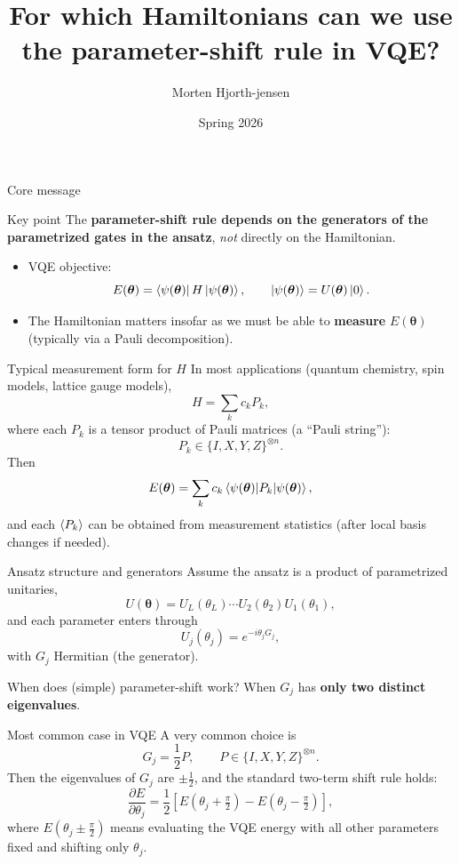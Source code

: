 \documentclass[aspectratio=169]{beamer}
\title[Parameter-shift for VQE]{For which Hamiltonians can we use the parameter-shift rule in VQE?}
\author{Morten Hjorth-jensen}
\date{Spring 2026}
\begin{document}
\begin{frame}
\titlepage
\end{frame}

\begin{frame}{Core message}
\begin{block}{Key point}
The \textbf{parameter-shift rule depends on the generators of the parametrized gates in the ansatz}, \emph{not} directly on the Hamiltonian.
\end{block}

\begin{itemize}
\item VQE objective:
\[
E(\bm{\theta})=\bra{\psi(\bm{\theta})}H\ket{\psi(\bm{\theta})},\qquad \ket{\psi(\bm{\theta})}=U(\bm{\theta})\ket{0}.
\]
\item The Hamiltonian matters insofar as we must be able to \textbf{measure} $E(\bm{\theta})$ (typically via a Pauli decomposition).
\end{itemize}
\end{frame}

\begin{frame}{Typical measurement form for $H$}
In most applications (quantum chemistry, spin models, lattice gauge models),
\[
H=\sum_{k} c_k P_k,
\]
where each $P_k$ is a tensor product of Pauli matrices (a ``Pauli string''):
\[
P_k \in \{I,X,Y,Z\}^{\otimes n}.
\]
Then
\[
E(\bm{\theta})=\sum_k c_k \expval{P_k}{\psi(\bm{\theta})},
\]
and each $\expval{P_k}$ can be obtained from measurement statistics (after local basis changes if needed).
\end{frame}

\begin{frame}{Ansatz structure and generators}
Assume the ansatz is a product of parametrized unitaries,
\[
U(\bm{\theta}) = U_L(\theta_L)\cdots U_2(\theta_2)U_1(\theta_1),
\]
and each parameter enters through
\[
U_j(\theta_j)=e^{-i\theta_j G_j},
\]
with $G_j$ Hermitian (the generator).
\medskip

\begin{block}{When does (simple) parameter-shift work?}
When $G_j$ has \textbf{only two distinct eigenvalues}.
\end{block}
\end{frame}

\begin{frame}{Most common case in VQE}
A very common choice is
\[
G_j = \frac{1}{2}P,\qquad P\in\{I,X,Y,Z\}^{\otimes n}.
\]
Then the eigenvalues of $G_j$ are $\pm \frac{1}{2}$, and the standard two-term shift rule holds:
\[
\frac{\partial E}{\partial \theta_j}
=\frac{1}{2}\left[E(\theta_j+\tfrac{\pi}{2})-E(\theta_j-\tfrac{\pi}{2})\right],
\]
where $E(\theta_j\pm \tfrac{\pi}{2})$ means evaluating the VQE energy with all other parameters fixed and shifting only $\theta_j$.
\end{frame}
\end{document}
